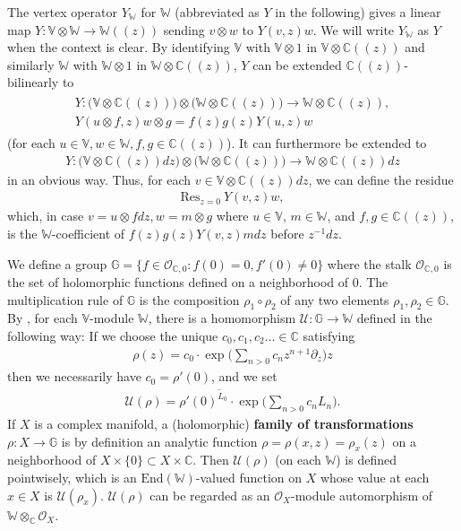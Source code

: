 \documentclass[12pt,a4paper,notitlepage]{article}
\theoremstyle{definition}
\theoremstyle{plain}
\newcommand{\mc}{\mathcal}
\newcommand{\wtd}{\widetilde}
\newcommand{\End}{\mathrm{End}} %
\newcommand{\Res}{\mathrm{Res}}
\newcommand{\scr}{\mathscr}
\newcommand{\Vbb}{\mathbb V}
\newcommand{\Wbb}{\mathbb W}
\newcommand{\Gbb}{\mathbb G}
\newcommand{\Cbb}{\mathbb C}
\numberwithin{equation}{section}
\begin{document}
The vertex operator  $Y_\Wbb$ for $\Wbb$ (abbreviated as $Y$ in the following) gives a linear map $Y:\Vbb\otimes\Wbb\rightarrow \Wbb((z))$ sending $v\otimes w$ to $Y(v,z)w$. We will write $Y_\Wbb$ as $Y$ when the context is clear. By identifying $\Vbb$ with $\Vbb\otimes 1$ in $\Vbb\otimes\Cbb((z))$ and similarly $\Wbb$ with $\Wbb\otimes 1$ in $\Wbb\otimes\Cbb((z))$, $Y$ can be extended $\Cbb((z))$-bilinearly to \index{Y@$Y_\Wbb=Y$}
\begin{gather}
\begin{array}{c}
Y:\Big(\Vbb\otimes\Cbb((z))\Big)\otimes\Big(\Wbb\otimes \Cbb((z))\Big)\rightarrow \Wbb\otimes\Cbb((z)),\\[1.5ex]
Y(u\otimes f,z)w\otimes g=f(z)g(z)Y(u,z)w
\end{array}\label{eq3}
\end{gather}
(for each $u\in\Vbb,w\in\Wbb,f,g\in\Cbb((z))$). It can furthermore be extended to 
\begin{align}
Y:	\Big(\Vbb\otimes\Cbb((z))dz\Big)\otimes \Big(\Wbb\otimes\Cbb((z))\Big)\rightarrow \Wbb\otimes \Cbb((z))dz \label{eq4}
\end{align}
in an obvious way. Thus, for each $v\in\Vbb\otimes\Cbb((z))dz$, we can define the residue \index{Res@$\Res$}
\begin{align}
\Res_{z=0}~Y(v,z)w,\label{eq5}
\end{align}
which, in case $v=u\otimes fdz,w=m\otimes g$ where $u\in\Vbb$, $m\in\Wbb$,  and $f,g\in\Cbb((z))$, is the $\Wbb$-coefficient of  $f(z)g(z)Y(v,z)mdz$ before $z^{-1}dz$.

We define a group $\Gbb=\{f\in\scr O_{\Cbb,0}:f(0)=0,f'(0)\neq 0\}$ \index{G@$\Gbb$} where the stalk $\scr O_{\Cbb,0}$ is the set of holomorphic functions defined on a neighborhood of $0$. The multiplication  rule of $\Gbb$ is the composition $\rho_1\circ\rho_2$ of any two elements $\rho_1,\rho_2\in\Gbb$. By \cite{Hua97}, for each $\Vbb$-module $\Wbb$, there is a homomorphism $\mc U:\Gbb\rightarrow\Wbb$ defined in the following way: If we choose the unique $c_0,c_1,c_2\dots\in\Cbb$ satisfying
\begin{align*}
\rho(z)=c_0\cdot\exp\Big(\sum_{n>0}c_nz^{n+1}\partial_z\Big)z
\end{align*}
then we necessarily have $c_0=\rho'(0)$, and we set \index{U@$\mc U(\rho)$}
\begin{align*}
\mc U(\rho)=\rho'(0)^{\wtd L_0}\cdot\exp\Big(\sum_{n>0}c_nL_n\Big).
\end{align*}
If $X$ is a complex manifold,  a (holomorphic) \textbf{family of transformations} $\rho:X\rightarrow\Gbb$ is by definition an analytic function $\rho=\rho(x,z)=\rho_x(z)$ on a neighborhood of  $X\times\{0\}\subset X\times\Cbb$. Then $\mc U(\rho)$ (on each $\Wbb$) is defined pointwisely, which is an $\End(\Wbb)$-valued function on $X$ whose value at each $x\in X$ is $\mc U(\rho_x)$. $\mc U(\rho)$ can be regarded as an $\scr O_X$-module automorphism of $\Wbb\otimes_\Cbb\scr O_X$. 
\end{document}
